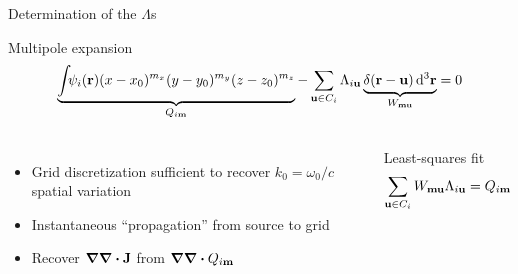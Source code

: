 \documentclass[aspectratio=169, usenames, dvipsnames]{beamer}
\begin{document}
\begin{frame}{Determination of the $\Lambda$s}
  \begin{block}{Multipole expansion}
    \begin{equation*}
      \underbrace{\int_{} \psi_i(\vb{r}) (x - x_0)^{m_x} (y - y_0)^{m_y} (z - z_0)^{m_z}}_{Q_{i\vb{m}}} - \sum_{\vb{u} \in C_i} \Lambda_{i \vb{u}} \underbrace{\delta(\vb{r} - \vb{u}) \dd[3]{\vb{r}}}_{W_{\vb{m}\vb{u}}} = 0
    \end{equation*}
  \end{block}
  \begin{columns}
      \begin{itemize}
        \item Grid discretization sufficient to recover $k_0 = \omega_0/c$ spatial variation
        \item Instantaneous ``propagation'' from source to grid
        \item Recover $\grad \div \vb{J}$ from $\grad \div Q_{i\vb{m}}$
      \end{itemize}

      \begin{block}{Least-squares fit}
        \begin{equation*}
          \sum_{\vb{u} \in C_i} W_{\vb{m}\vb{u}} \Lambda_{i \vb{u}} = Q_{i\vb{m}}
        \end{equation*}
      \end{block}
  \end{columns}
\end{frame}
\end{document}
